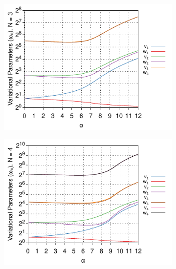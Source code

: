 \begin{figure}[!tbp]
\begin{subfigure}[b]{0.49\textwidth}
  \end{subfigure}
  \begin{subfigure}[b]{0.49\textwidth}
    \centering
    \includegraphics[width=\textwidth]{figures/frohlich-3d-multivariate-vw-alpha-0to12-beta-inf-N-3-COLOUR.pdf}
  \end{subfigure}
  \begin{subfigure}[b]{0.49\textwidth}
    \centering
    \includegraphics[width=\textwidth]{figures/frohlich-3d-multivariate-vw-alpha-0to12-beta-inf-N-4-COLOUR.pdf}
  \end{subfigure}
  \begin{subfigure}[b]{0.49\textwidth}
    \centering

\end{subfigure}
\end{figure}
